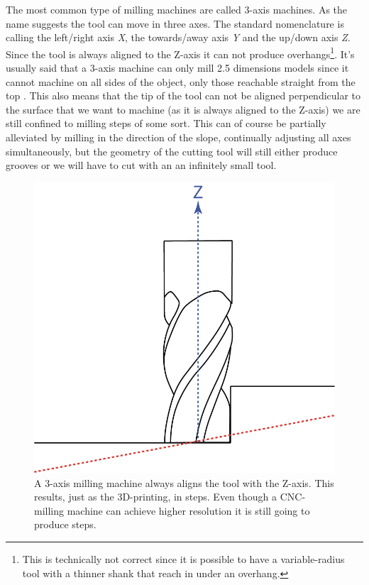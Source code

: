 \documentclass{article}
\begin{document}
The most common type of milling machines are called 3-axis machines. As
the name suggests the tool can move in three axes. The standard
nomenclature is calling the left/right axis \emph{X}, the towards/away
axis \emph{Y} and the up/down axis \emph{Z}. Since the tool is always
aligned to the Z-axis it can not produce overhangs\footnote{This is
  technically not correct since it is possible to have a variable-radius
  tool with a thinner shank that reach in under an overhang.}. It's
usually said that a 3-axis machine can only mill 2.5 dimensions models
since it cannot machine on all sides of the object, only those reachable
straight from the top . This also means that the tip of the tool can not
be aligned perpendicular to the surface that we want to machine (as it
is always aligned to the Z-axis) we are still confined to milling steps
of some sort. This can of course be partially alleviated by milling in
the direction of the slope, continually adjusting all axes
simultaneously, but the geometry of the cutting tool will still either
produce grooves or we will have to cut with an an infinitely small tool.

\begin{figure}[ht!]
\centering
\includegraphics{images/milling-z-aligned.png}
\caption{A 3-axis milling machine always aligns the tool with the Z-axis. This results, just as the 3D-printing, in steps. Even though a CNC-milling machine can achieve higher resolution it is still going to produce steps.}
\end{figure}
\end{document}
